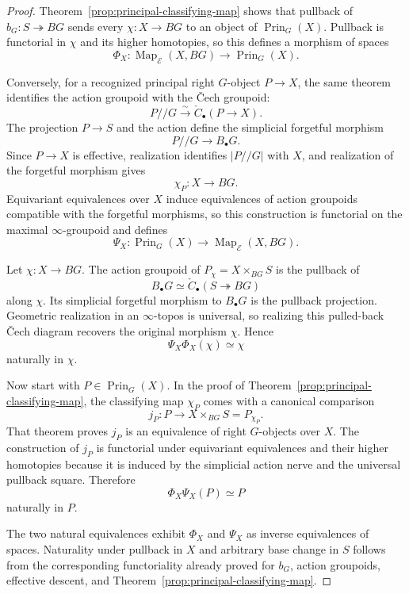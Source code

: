 \begin{proof}
Theorem~\ref{prop:principal-classifying-map} shows that pullback of
$b_G:S\twoheadrightarrow BG$ sends every
$\chi:X\to BG$ to an object of $\operatorname{Prin}_G(X)$.  Pullback is
functorial in $\chi$ and its higher homotopies, so this defines a morphism of
spaces
\[
    \Phi_X:
    \operatorname{Map}_{\mathcal E}(X,BG)
    \longrightarrow
    \operatorname{Prin}_G(X).
\]

Conversely, for a recognized principal right $G$-object $P\to X$, the same
theorem identifies the action groupoid with the \v{C}ech groupoid:
\[
    P/\!/G
    \xrightarrow{\sim}
    \check C_\bullet(P\to X).
\]
The projection $P\to S$ and the action define the simplicial forgetful
morphism
\[
    P/\!/G\longrightarrow B_\bullet G.
\]
Since $P\to X$ is effective, realization identifies
$|P/\!/G|$ with $X$, and realization of the forgetful morphism gives
\[
    \chi_P:X\longrightarrow BG.
\]
Equivariant equivalences over $X$ induce equivalences of action groupoids
compatible with the forgetful morphisms, so this construction is functorial
on the maximal $\infty$-groupoid and defines
\[
    \Psi_X:
    \operatorname{Prin}_G(X)
    \longrightarrow
    \operatorname{Map}_{\mathcal E}(X,BG).
\]

Let $\chi:X\to BG$.  The action groupoid of
$P_\chi=X\times_{BG}S$ is the pullback of
\[
    B_\bullet G
    \simeq
    \check C_\bullet(S\twoheadrightarrow BG)
\]
along $\chi$.  Its simplicial forgetful morphism to $B_\bullet G$ is the
pullback projection.  Geometric realization in an $\infty$-topos is
universal, so realizing this pulled-back \v{C}ech diagram recovers the
original morphism $\chi$.  Hence
\[
    \Psi_X\Phi_X(\chi)\simeq\chi
\]
naturally in $\chi$.

Now start with $P\in\operatorname{Prin}_G(X)$.  In the proof of
Theorem~\ref{prop:principal-classifying-map}, the classifying map $\chi_P$
comes with a canonical comparison
\[
    j_P:
    P\longrightarrow
    X\times_{BG}S
    =
    P_{\chi_P}.
\]
That theorem proves $j_P$ is an equivalence of right $G$-objects over $X$.
The construction of $j_P$ is functorial under equivariant equivalences and
their higher homotopies because it is induced by the simplicial action nerve
and the universal pullback square.  Therefore
\[
    \Phi_X\Psi_X(P)\simeq P
\]
naturally in $P$.

The two natural equivalences exhibit $\Phi_X$ and $\Psi_X$ as inverse
equivalences of spaces.  Naturality under pullback in $X$ and arbitrary base
change in $S$ follows from the corresponding functoriality already proved for
$b_G$, action groupoids, effective descent, and
Theorem~\ref{prop:principal-classifying-map}.
\end{proof}

